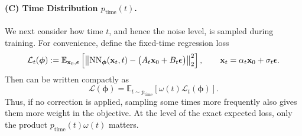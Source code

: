 \paragraph{(C) Time Distribution $p_{\text{time}}(t)$.}
We next consider how time $t$, and hence the noise level, is sampled during
training. For convenience, define the fixed-time regression loss
\[
\mathcal{L}_t(\bm{\phi})
:=
\mathbb{E}_{{\mathbf{x}}_0,{\bm{\epsilon}}}
\left[
\left\|
\mathrm{NN}_{\bm{\phi}}({\mathbf{x}}_t,t)
-
\bigl(A_t{\mathbf{x}}_0+B_t{\bm{\epsilon}}\bigr)
\right\|_2^2
\right],
\qquad
{\mathbf{x}}_t=\alpha_t{\mathbf{x}}_0+\sigma_t{\bm{\epsilon}}.
\]
Then  can be written compactly as
\[
\mathcal{L}(\bm{\phi})
=
\mathbb{E}_{t\sim p_{\text{time}}}
\left[
\omega(t)\mathcal{L}_t(\bm{\phi})
\right].
\]
Thus, if no correction is applied, sampling some times more frequently also
gives them more weight in the objective. At the level of the exact expected
loss, only the product $p_{\text{time}}(t)\omega(t)$ matters.

